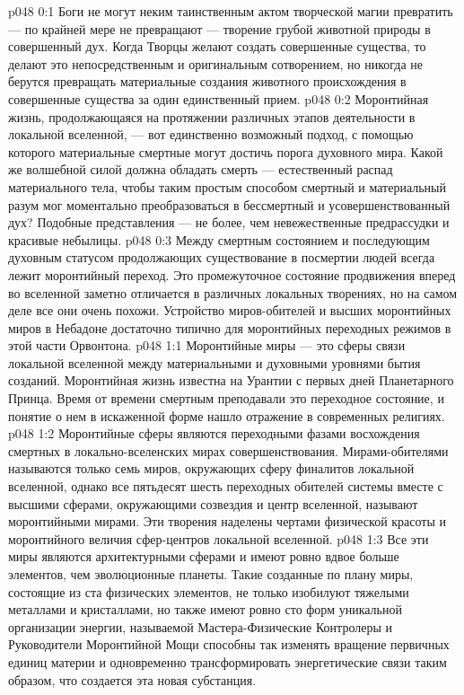 \vs p048 0:1 Боги не могут неким таинственным актом творческой магии превратить --- по крайней мере не превращают --- творение грубой животной природы в совершенный дух. Когда Творцы желают создать совершенные существа, то делают это непосредственным и оригинальным сотворением, но никогда не берутся превращать материальные создания животного происхождения в совершенные существа за один единственный прием.
\vs p048 0:2 Моронтийная жизнь, продолжающаяся на протяжении различных этапов деятельности в локальной вселенной, --- вот единственно возможный подход, с помощью которого материальные смертные могут достичь порога духовного мира. Какой же волшебной силой должна обладать смерть --- естественный распад материального тела, чтобы таким простым способом смертный и материальный разум мог моментально преобразоваться в бессмертный и усовершенствованный дух? Подобные представления --- не более, чем невежественные предрассудки и красивые небылицы.
\vs p048 0:3 Между смертным состоянием и последующим духовным статусом продолжающих существование в посмертии людей всегда лежит моронтийный переход. Это промежуточное состояние продвижения вперед во вселенной заметно отличается в различных локальных творениях, но на самом деле все они очень похожи. Устройство миров\hyp{}обителей и высших моронтийных миров в Небадоне достаточно типично для моронтийных переходных режимов в этой части Орвонтона.
\vs p048 1:1 Моронтийные миры --- это сферы связи локальной вселенной между материальными и духовными уровнями бытия созданий. Моронтийная жизнь известна на Урантии с первых дней Планетарного Принца. Время от времени смертным преподавали это переходное состояние, и понятие о нем в искаженной форме нашло отражение в современных религиях.
\vs p048 1:2 Моронтийные сферы являются переходными фазами восхождения смертных в локально\hyp{}вселенских мирах совершенствования. Мирами\hyp{}обителями называются только семь миров, окружающих сферу финалитов локальной вселенной, однако все пятьдесят шесть переходных обителей системы вместе с высшими сферами, окружающими созвездия и центр вселенной, называют моронтийными мирами. Эти творения наделены чертами физической красоты и моронтийного величия сфер\hyp{}центров локальной вселенной.
\vs p048 1:3 Все эти миры являются архитектурными сферами и имеют ровно вдвое больше элементов, чем эволюционные планеты. Такие созданные по плану миры, состоящие из ста физических элементов, не только изобилуют тяжелыми металлами и кристаллами, но также имеют ровно сто форм уникальной организации энергии, называемой  Мастера\hyp{}Физические Контролеры и Руководители Моронтийной Мощи способны так изменять вращение первичных единиц материи и одновременно трансформировать энергетические связи таким образом, что создается эта новая субстанция.
